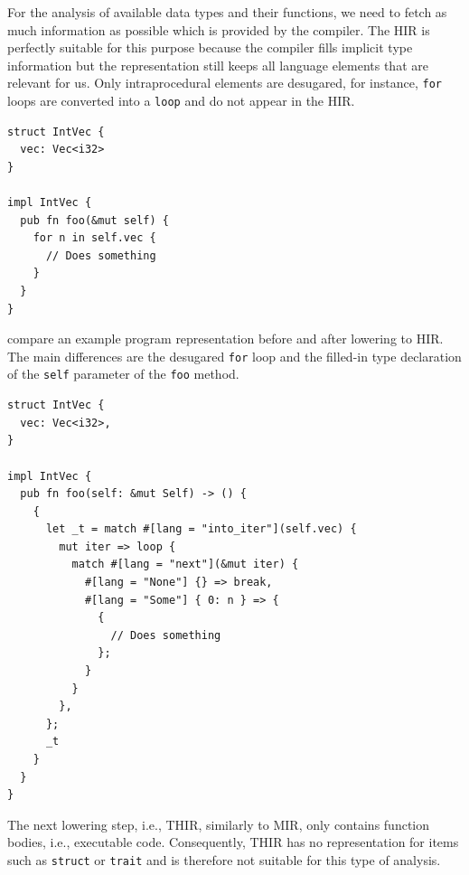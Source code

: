 \documentclass[paper=a4,%
  twoside,%
  BCOR4mm,%
  abstract=true,%
  toc=bibliography,%
  chapterprefix=true,%
  toc=bibliographynumbered,%
  open=right,%
  english,%
  pagesize=pdftex]{scrreprt}
\newcommand{\hir}{\ac{HIR}\xspace}
\newcommand{\mir}{\ac{MIR}\xspace}
\begin{document}
For the analysis of available data types and their functions, we need to fetch as much information as possible which is provided by the compiler. The \hir is perfectly suitable for this purpose because the compiler fills implicit type information but the representation still keeps all language elements that are relevant for us. Only intraprocedural elements are desugared, for instance, \texttt{for} loops are converted into a \texttt{loop} and do not appear in the \hir.
\begin{lstlisting}[style=boxed, caption={An example Rust program that we lower to its \hir}, label=lst:hir-lowering]
struct IntVec {
  vec: Vec<i32>
}

impl IntVec {
  pub fn foo(&mut self) {
    for n in self.vec {
      // Does something
    }
  }
}
\end{lstlisting}

 compare an example program representation before and after lowering to \hir. The main differences are the desugared \texttt{for} loop and the filled-in type declaration of the \texttt{self} parameter of the \texttt{foo} method. %

\begin{lstlisting}[style=boxed, caption={\hir of the code shown in \Cref{lst:hir-lowering}}, label=lst:hir-lowered]
struct IntVec {
  vec: Vec<i32>,
}

impl IntVec {
  pub fn foo(self: &mut Self) -> () {
    {
      let _t = match #[lang = "into_iter"](self.vec) {
        mut iter => loop {
          match #[lang = "next"](&mut iter) {
            #[lang = "None"] {} => break,
            #[lang = "Some"] { 0: n } => {
              {
                // Does something
              };
            }
          }
        },
      };
      _t
    }
  }
}
\end{lstlisting}

The next lowering step, i.e., \ac{THIR}, similarly to \mir, only contains function bodies, i.e., executable code. Consequently, \ac{THIR} has no representation for items such as \texttt{struct} or \texttt{trait} and is therefore not suitable for this type of analysis.
\end{document}
